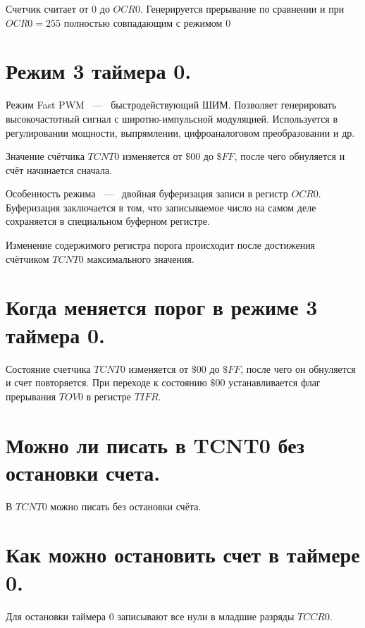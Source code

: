 Счетчик считает от $0$ до $OCR0$. Генерируется прерывание по сравнении и при $OCR0 = 255$ 
полностью совпадающим с режимом $0$

\section{Режим 3 таймера 0.}
Режим Fast PWM ~---~ быстродействующий ШИМ. Позволяет генерировать
высокочастотный сигнал с широтно-импульсной модуляцией. Используется 
в регулировании мощности, выпрямлении, цифроаналоговом преобразовании и др.

Значение счётчика $TCNT0$ изменяется от $\$00$ до $\$FF$, после чего 
обнуляется и счёт начинается сначала. 


Особенность режима ~---~ двойная буферизация записи в регистр $OCR0$.
Буферизация заключается в том, что записываемое число на самом деле сохраняется в
специальном буферном регистре.

Изменение содержимого регистра порога происходит после достижения 
счётчиком $TCNT0$ максимального значения. 

\section{Когда меняется порог в режиме 3 таймера 0.}
Состояние счетчика $TCNT0$ изменяется от $\$00$ до $\$FF$, после чего он обнуляется и счет 
повторяется. При переходе к состоянию $\$00$ устанавливается флаг прерывания $TOV0$ в 
регистре $TIFR$.

\section{Можно ли писать в TCNT0 без остановки счета.}
В $TCNT0$ можно писать без остановки счёта.

\section{Как можно остановить счет в таймере 0.}
Для остановки таймера $0$ записывают все нули в младшие разряды $TCCR0$.


